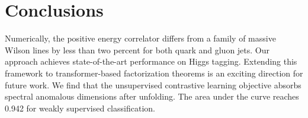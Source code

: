 \section{Conclusions}\label{sec:conclusions}

Numerically, the positive energy correlator differs from a family of
massive Wilson lines by less than two percent for both quark and gluon
jets. Our approach achieves state-of-the-art performance on Higgs
tagging. Extending this framework to transformer-based factorization
theorems is an exciting direction for future work. We find that the
unsupervised contrastive learning objective absorbs spectral anomalous
dimensions after unfolding. The area under the curve reaches 0.942 for
weakly supervised classification.

